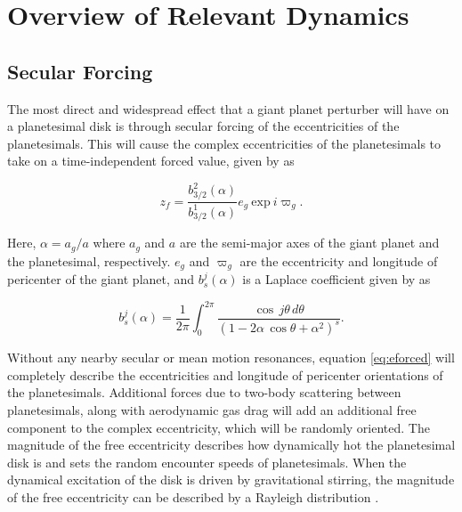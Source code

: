 \documentclass[twocolumn]{aastex63}
\begin{document}
\section{Overview of Relevant Dynamics} \label{sec:dynamics}

\subsection{Secular Forcing}\label{sec:sec_force}

The most direct and widespread effect that a giant planet perturber will have on a planetesimal disk is through secular forcing of the 
eccentricities of the planetesimals. This will cause the complex eccentricities of the planetesimals to take on a time-independent 
forced value, given by \citep{1999ApJ...527..918W} as

\begin{equation}\label{eq:eforced}
	z_{f} = \frac{b^{2}_{3/2} (\alpha)}{b^{1}_{3/2} (\alpha)} e_{g} ~ \mathrm{exp} ~ i \varpi_{g}.
\end{equation}

\noindent Here, $\alpha = a_{g} / a$ where $a_{g}$ and $a$ are the semi-major axes of the giant planet and the planetesimal, 
respectively. $e_{g}$ and $\varpi_{g}$ are the eccentricity and
longitude of pericenter of the giant planet, and $b^{j}_{s} (\alpha)$ is a 
Laplace coefficient given by \citep{2000ssd..book.....M} as

\begin{equation}\label{eq:lap}
	b_{s}^{j}(\alpha) = \frac{1}{2 \pi} \int_{0}^{2 \pi} \frac{\cos \, j \theta \, d \theta}{\left( 1 - 2 \alpha \, \cos \theta + \alpha^2 \right)^{s}}.
\end{equation}

Without any nearby secular or mean motion resonances, equation \ref{eq:eforced} will completely describe the eccentricities and longitude of  
pericenter orientations of the planetesimals. Additional forces due to two-body scattering between planetesimals, along with 
aerodynamic gas drag will add an additional free component to the complex eccentricity, which will be randomly oriented. The 
magnitude of the free eccentricity describes how dynamically hot the planetesimal disk is and sets the random encounter speeds of 
planetesimals. When the dynamical excitation of the disk is driven by gravitational stirring, the magnitude of the free eccentricity can 
be described by a Rayleigh distribution \citep{1992Icar...96..107I}.
\end{document}
